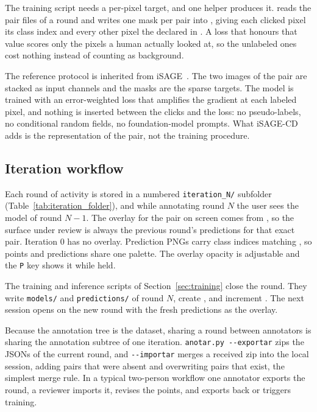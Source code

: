 The training script needs a per-pixel target, and one helper
produces it.  reads the pair
files of a round and writes one mask per pair into
, giving each clicked pixel its class index
and every other pixel the  declared in
. A loss that honours that value scores
only the pixels a human actually looked at, so the unlabeled ones
cost nothing instead of counting as background.

The reference protocol is inherited from iSAGE~\cite{isage}. The
two images of the pair are stacked as input channels and the masks
are the sparse targets. The model is
trained with an error-weighted loss that amplifies the gradient at
each labeled pixel, and nothing is inserted between the clicks and
the loss: no pseudo-labels, no conditional random fields, no
foundation-model prompts. What iSAGE-CD adds is the representation
of the pair, not the training procedure.

\subsection{Iteration workflow}
\label{sec:iteration}

Each round of activity is stored in a numbered
\texttt{iteration\_N/} subfolder
(Table~\ref{tab:iteration_folder}), and while annotating round $N$
the user sees the model of round $N-1$.
The overlay for the pair on screen comes from
,
so the surface under review is always the previous round's
predictions for that exact pair. Iteration 0 has no overlay.
Prediction PNGs carry class indices matching
, so points and predictions share
one palette. The overlay opacity is adjustable and the \texttt{P}
key shows it while held.

The training and inference scripts of
Section~\ref{sec:training} close the round. They write
\texttt{models/} and \texttt{predictions/} of round $N$, create
, and increment
. The next session opens on the new
round with the fresh predictions as the overlay.

Because the annotation tree is the dataset, sharing a round between
annotators is sharing the annotation subtree of one iteration.
\texttt{anotar.py -{}-exportar} zips the JSONs of the current
round, and \texttt{-{}-importar} merges a received zip into the
local session, adding pairs that were absent and overwriting pairs
that exist, the simplest merge rule. In a typical two-person
workflow one annotator exports the round, a reviewer imports it,
revises the points, and exports back or triggers training.
